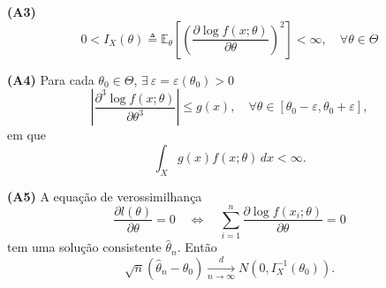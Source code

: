 \textbf{(A3)} 
\begin{equation}
0 < I_X(\theta) \triangleq \mathbb{E}_\theta \left[ \left( \frac{\partial \log f(x; \theta)}{\partial \theta} \right)^2 \right] < \infty, \quad \forall \theta \in \Theta
\end{equation}

\textbf{(A4)} Para cada $\theta_0 \in \Theta$, $\exists \ \varepsilon = \varepsilon(\theta_0) > 0$
\begin{equation}
\left| \frac{\partial^3 \log f(x; \theta)}{\partial \theta^3} \right| \leq g(x), \quad \forall \theta \in [\theta_0 - \varepsilon, \theta_0 + \varepsilon],
\end{equation}
em que
\begin{equation}
\int_X g(x) f(x; \theta) \, dx < \infty.
\end{equation}

\textbf{(A5)} A equação de verossimilhança
\begin{equation}
\frac{\partial l(\theta)}{\partial \theta} = 0 \quad \Leftrightarrow \quad \sum_{i=1}^n \frac{\partial \log f(x_i; \theta)}{\partial \theta} = 0
\end{equation}
tem uma solução consistente $\hat{\theta}_n$. Então
\begin{equation}
\sqrt{n} (\hat{\theta}_n - \theta_0) \xrightarrow[n \to \infty]{d} N\left(0, I_X^{-1}(\theta_0)\right).
\end{equation}